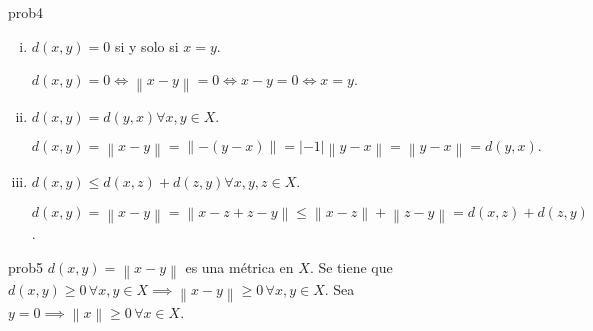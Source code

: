 \begin{sol}{prob4}
	\leavevmode
	\begin{enumerate}[i)]
		\item $d\left(x,y\right)=0$ si y solo si $x=y$.


		      \begin{math}
			      d\left(x,y\right)=
			      0\iff
			      \left\|x-y\right\|=
			      0\iff
			      x-y=
			      0\iff
			      x=
			      y
		      \end{math}.

		\item

		      \begin{math}
			      d\left(x,y\right)=
			      d\left(y,x\right)\forall
			      x,y\in X
		      \end{math}.

		      \begin{math}
			      d\left(x,y\right)=
			      \left\|x-y\right\|=
			      \left\|-\left(y-x\right)\right\|=
			      \left|-1\right|\left\|y-x\right\|=
			      \left\|y-x\right\|=
			      d\left(y,x\right).
		      \end{math}


		\item

		      \begin{math}
			      d\left(x,y\right)\leq
			      d\left(x,z\right)+d\left(z,y\right)\forall
			      x,y,z\in X
		      \end{math}.

		      \begin{math}
			      d\left(x,y\right)=
			      \left\|x-y\right\|=
			      \left\|x-z+z-y\right\|\leq
			      \left\|x-z\right\|+\left\|z-y\right\|=
			      d\left(x,z\right)+d\left(z,y\right)
		      \end{math}.
	\end{enumerate}
\end{sol}

\begin{sol}{prob5}
	\begin{math}
		d\left(x,y\right)=
		\left\|x-y\right\|
	\end{math}
	es una métrica
	en $X$.
	Se tiene que
	\begin{math}
		d\left(x,y\right)\geq
		0\,\forall
		x,y\in X\implies
		\left\|x-y\right\|\geq
		0\,\forall x,y\in X
	\end{math}.
	Sea
	\begin{math}
		y=
		0\implies
		\left\|x\right\|\geq
		0\,\forall
		x\in X
	\end{math}.
\end{sol}

